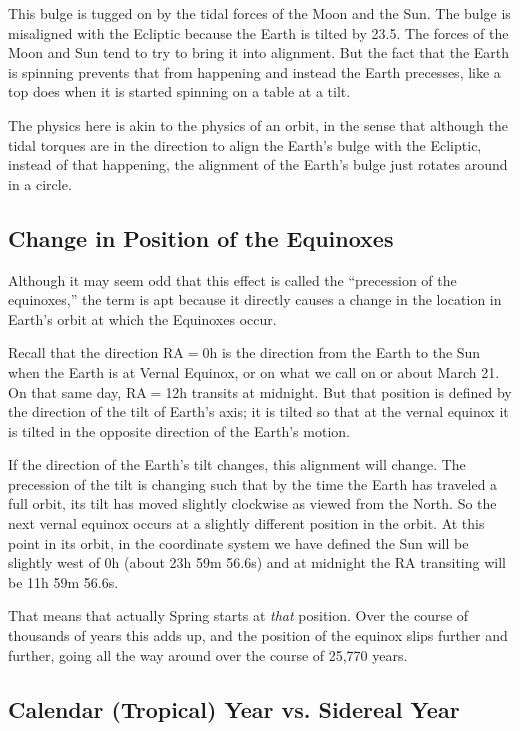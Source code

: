 \documentclass[12pt, preprint]{aastex}
\begin{document}
This bulge is tugged on by the tidal forces of the Moon and the
Sun. The bulge is misaligned with the Ecliptic because the Earth is
tilted by 23.5\degree.  The forces of the Moon and Sun tend to try to
bring it into alignment. But the fact that the Earth is spinning
prevents that from happening and instead the Earth precesses, like a
top does when it is started spinning on a table at a tilt.

The physics here is akin to the physics of an orbit, in the sense that
although the tidal torques are in the direction to align the Earth's
bulge with the Ecliptic, instead of that happening, the alignment of
the Earth's bulge just rotates around in a circle.

\subsection{Change in Position of the Equinoxes}

Although it may seem odd that this effect is called the ``precession
of the equinoxes,'' the term is apt because it directly causes a
change in the location in Earth's orbit at which the Equinoxes occur.

Recall that the direction RA$=$0h is the direction from the Earth to
the Sun when the Earth is at Vernal Equinox, or on what we call on or
about March 21. On that same day, RA$=$12h transits at midnight. But
that position is defined by the direction of the tilt of Earth's axis;
it is tilted so that at the vernal equinox it is tilted in the
opposite direction of the Earth's motion.

If the direction of the Earth's tilt changes, this alignment will
change. The precession of the tilt is changing such that by the time
the Earth has traveled a full orbit, its tilt has moved slightly
clockwise as viewed from the North. So the next vernal equinox occurs
at a slightly different position in the orbit. At this point in its
orbit, in the coordinate system we have defined the Sun will be
slightly west of 0h (about 23h 59m 56.6s) and at midnight the RA
transiting will be 11h 59m 56.6s.

That means that actually Spring starts at {\it that} position. Over
the course of thousands of years this adds up, and the position of the
equinox slips further and further, going all the way around over the
course of 25,770 years.

\subsection{Calendar (Tropical) Year vs. Sidereal Year}
\end{document}
